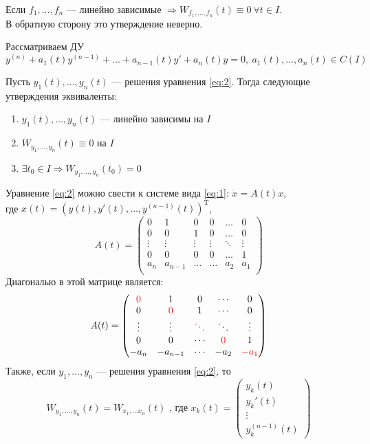 \documentclass[11pt]{article}
\begin{document}
\begin{statement}
    Если $f_1, \ldots, f_n$ --- линейно зависимые $\Rightarrow W_{f_1, \ldots, f_n}(t)  \equiv 0 \ \forall t\in I$.\\
    В обратную сторону это утверждение неверно.
\end{statement}

Рассматриваем ДУ 
\begin{equation}\label{eq:2}
    y^{(n)} + a_1(t)y^{(n-1)} + \ldots + a_{n-1}(t)y' + a_n(t)y=0, \ a_1(t), \ldots, a_n(t) \in C(I)
\end{equation}

\begin{theorem}
    Пусть $y_1(t), \ldots, y_n(t)$ --- решения уравнения \eqref{eq:2}. Тогда следующие утверждения эквиваленты:
    \begin{enumerate}
        \item $y_1(t), \ldots, y_n(t)$ --- линейно зависимы на $I$
        \item $W_{y_1, \ldots, y_n}(t) \equiv 0$ на $I$
        \item $\exists t_0\in I \Rightarrow W_{y_1, \ldots, y_n} (t_0) = 0$
    \end{enumerate}
\end{theorem}

\begin{remark}
    Уравнение \eqref{eq:2} можно свести к системе вида \eqref{eq:1}: $\dot{x} = A(t)x$, \\
    где $x(t) = (y(t), y'(t), \ldots, y^{(n-1)}(t))^{\text{T}}$, 
    \[ A(t) = \begin{pmatrix}
        0 & 1 & 0 & 0 & \dots & 0 \\
        0 & 0 & 1 & 0 & \dots & 0 \\
        \vdots & \vdots & \vdots & \vdots & \ddots & \vdots \\
        0 & 0 & 0 & 0 & \dots & 1 \\
        a_n & a_{n-1} & \dots & \dots & a_2 & a_1 \\
    \end{pmatrix} \]
    Диагональю в этой матрице является:
    \[
    A(t) =
    \begin{pmatrix}
        \textcolor{red}{0} & 1 & 0 & \cdots & 0 \\
        0 & \textcolor{red}{0} & 1 & \cdots & 0 \\
        \vdots & \vdots & \textcolor{red}{\ddots} & \ddots & \vdots \\
        0 & 0 & \cdots & \textcolor{red}{0} & 1 \\
        -a_n & -a_{n-1} & \cdots & -a_2 & \textcolor{red}{-a_1}
    \end{pmatrix} \]
    Также, если $y_1, \ldots, y_n$ --- решения уравнения \eqref{eq:2}, то 
    \[ W_{y_1, \ldots, y_n} (t) = W_{x_1, \ldots x_n}(t) \text{ , где } x_k(t) = \begin{pmatrix}
        y_k(t)\\
        y_k'(t)\\
        \vdots\\
        y_k^{(n-1)}(t) 
        
    \end{pmatrix}\] 
\end{remark}
\end{document}
